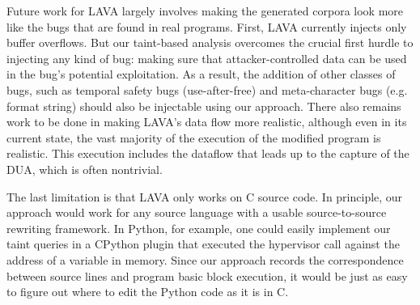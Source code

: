 
Future work for LAVA largely involves making the generated corpora look more like the bugs that are found in real programs. First, LAVA currently injects only buffer overflows. But our taint-based analysis overcomes the crucial first hurdle to injecting any kind of bug: making sure that attacker-controlled data can be used in the bug's potential exploitation. As a result, the addition of other classes of bugs, such as temporal safety bugs (use-after-free) and meta-character bugs (e.g. format string) should also be injectable using our approach. There also remains work to be done in making LAVA's data flow more realistic, although even in its current state, the vast majority of the execution of the modified program is realistic. This execution includes the dataflow that leads up to the capture of the DUA, which is often nontrivial.

The last limitation is that LAVA only works on C source code. In principle, our approach would work for any source language with a usable source-to-source rewriting framework. In Python, for example, one could easily implement our taint queries in a CPython plugin that executed the hypervisor call against the address of a variable in memory. Since our approach records the correspondence between source lines and program basic block execution, it would be just as easy to figure out where to edit the Python code as it is in C.
